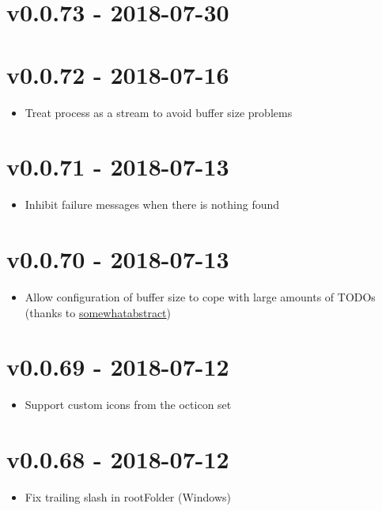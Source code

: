 \chapter{v0.0.73 - 2018-07-30}

\chapter{v0.0.72 - 2018-07-16}
\begin{itemize}
\item{Treat process as a stream to avoid buffer size problems}
\end{itemize}

\chapter{v0.0.71 - 2018-07-13}
\begin{itemize}
\item{Inhibit failure messages when there is nothing found}
\end{itemize}

\chapter{v0.0.70 - 2018-07-13}
\begin{itemize}
\item{Allow configuration of buffer size to cope with large amounts of TODOs (thanks to \href{https://github.com/somewhatabstract}{somewhatabstract})}
\end{itemize}

\chapter{v0.0.69 - 2018-07-12}
\begin{itemize}
\item{Support custom icons from the octicon set}
\end{itemize}

\chapter{v0.0.68 - 2018-07-12}
\begin{itemize}
\item{Fix trailing slash in rootFolder (Windows)}
\end{itemize}

